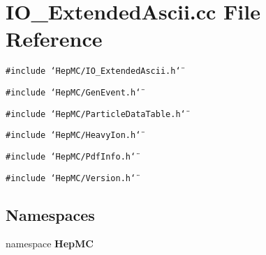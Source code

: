\section{IO\_\-Extended\-Ascii.cc File Reference}
\label{IO__ExtendedAscii_8cc}
{\tt \#include \char`\"{}Hep\-MC/IO\_\-Extended\-Ascii.h\char`\"{}}\par
{\tt \#include \char`\"{}Hep\-MC/Gen\-Event.h\char`\"{}}\par
{\tt \#include \char`\"{}Hep\-MC/Particle\-Data\-Table.h\char`\"{}}\par
{\tt \#include \char`\"{}Hep\-MC/Heavy\-Ion.h\char`\"{}}\par
{\tt \#include \char`\"{}Hep\-MC/Pdf\-Info.h\char`\"{}}\par
{\tt \#include \char`\"{}Hep\-MC/Version.h\char`\"{}}\par
\subsection*{Namespaces}
\begin{CompactItemize}
\item 
namespace {\bf Hep\-MC}
\end{CompactItemize}

